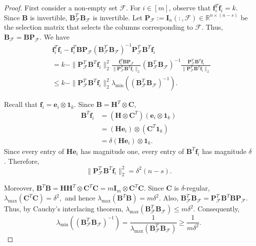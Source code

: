 \documentclass[journal,draftcls,onecolumn]{IEEEtran}
\theoremstyle{mystyle}
\newcommand{\bfC}{\mathbf{C}}
\newcommand{\bfH}{\mathbf{H}}
\newcommand{\bfB}{\mathbf{B}}
\newcommand{\bfI}{\mathbf{I}}
\newcommand{\bfP}{\mathbf{P}}
\newcommand{\cF}{\mathcal{F}}
\begin{document}
\begin{proof}
First consider a non-empty set $\cF$. For $i\in[m]$, observe that
$\mathbf{f}_i^T\mathbf{f}_i=k$. Since $\bfB$ is invertible,
$\bfB_{\cF}^T\bfB_{\cF}$ is invertible.  Let
$\bfP_{\cF}:=\bfI_n(:,\cF)\in\mathbb{R}^{n\times(n-s)}$
be the selection matrix that selects the columns corresponding to $\cF$.
Thus, $\bfB_{\cF}=\bfB\bfP_{\cF}$. We have
\begin{align*}
&\mathbf{f}_i^T\mathbf{f}_i
-\mathbf{f}_i^T\bfB\bfP_{\cF}
(\bfB_{\cF}^T\bfB_{\cF})^{-1}
\bfP_{\cF}^T\bfB^T\mathbf{f}_i\\
&=k-\|\bfP_{\cF}^T\bfB^T\mathbf{f}_i\|_2^2
\frac{\mathbf{f}_i^T\bfB\bfP_{\cF}}
{\|\bfP_{\cF}^T\bfB^T\mathbf{f}_i\|_2}
(\bfB_{\cF}^T\bfB_{\cF})^{-1}
\frac{\bfP_{\cF}^T\bfB^T\mathbf{f}_i}
{\|\bfP_{\cF}^T\bfB^T\mathbf{f}_i\|_2}\\
&\leq
k-\|\bfP_{\cF}^T\bfB^T\mathbf{f}_i\|_2^2
\lambda_{\min}\left(
(\bfB_{\cF}^T\bfB_{\cF})^{-1}
\right).
\end{align*}

Recall that $\mathbf{f}_i=\mathbf{e}_i\otimes\mathbf{1}_k$. Since
$\bfB=\bfH^T\otimes\bfC$,
\begin{align*}
\bfB^T\mathbf{f}_i
&=(\bfH\otimes\bfC^T)
(\mathbf{e}_i\otimes\mathbf{1}_k)\\
&=(\bfH\mathbf{e}_i)\otimes
(\bfC^T\mathbf{1}_k)\\
&=\delta(\bfH\mathbf{e}_i)\otimes\mathbf{1}_k.
\end{align*}
Since every entry of $\bfH\mathbf{e}_i$ has magnitude one,
every entry of $\bfB^T\mathbf{f}_i$ has magnitude $\delta$. Therefore,
\begin{equation}
\label{eq:Hada_Coset_f_norm}
\|\bfP_{\cF}^T\bfB^T\mathbf{f}_i\|_2^2
=\delta^2(n-s).
\end{equation}

Moreover,
$
\bfB^T\bfB
=
\bfH\bfH^T\otimes\bfC^T\bfC
=
m\bfI_m\otimes\bfC^T\bfC.
$ Since $\bfC$ is $\delta$-regular,
$
\lambda_{\max}(\bfC^T\bfC)=\delta^2,
$
and hence
$
\lambda_{\max}(\bfB^T\bfB)=m\delta^2.
$
Also,
$
\bfB_{\cF}^T\bfB_{\cF}
=
\bfP_{\cF}^T\bfB^T\bfB\bfP_{\cF}.
$
Thus, by Cauchy's interlacing theorem,
$
\lambda_{\max}(\bfB_{\cF}^T\bfB_{\cF})
\leq m\delta^2
$. Consequently,
\[
\lambda_{\min}\left(
(\bfB_{\cF}^T\bfB_{\cF})^{-1}
\right)
=
\frac{1}{
\lambda_{\max}(\bfB_{\cF}^T\bfB_{\cF})
}
\geq \frac{1}{m\delta^2}.
\]


\end{proof}
\end{document}
